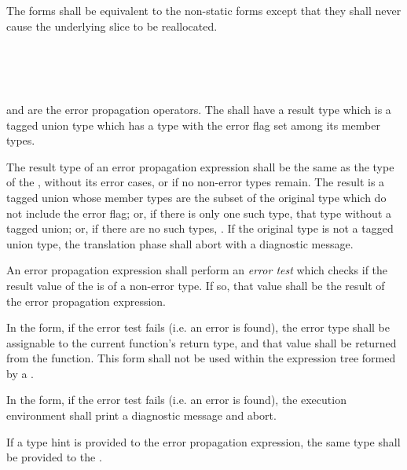 \specsubsubitem
The  forms shall be equivalent to the non-static forms except
that they shall never cause the underlying slice to be reallocated.


\begin{grammar}
 \\
	  \\
	 \terminal{!} \\
\end{grammar}

\specsubsubitem
{} and \terminal{!} are the error propagation operators. The
 shall have a result type which is
a tagged union type which has a type with the error flag set
among its member types.

\specsubsubitem
The result type of an error propagation expression shall be the same as the
type of the , without its error cases, or
 if no non-error types remain. The result is a tagged union
whose member types are the subset of the original type which do not include the
error flag; or, if there is only one such type, that type without a tagged
union; or, if there are no such types, . If the original type is
not a tagged union type, the translation phase shall abort with a diagnostic
message.

\specsubsubitem
An error propagation expression shall perform an \textit{error test} which
checks if the result value of the  is of a
non-error type. If so, that value shall be the result of the error propagation
expression.

\specsubsubitem
In the  form, if the error test fails (i.e. an error is found), the
error type shall be assignable to the current function's return type, and that
value shall be returned from the function. This form shall not be used within
the expression tree formed by a .

\specsubsubitem
In the \terminal{!} form, if the error test fails (i.e. an error is found), the
execution environment shall print a diagnostic message and abort.

\specsubsubitem
If a type hint is provided to the error propagation expression, the same type
shall be provided to the .

